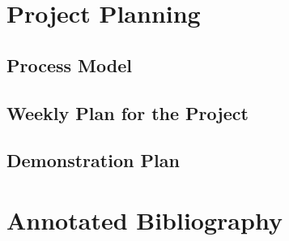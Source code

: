 \documentclass[11pt,fleqn,twoside]{article}
\begin{document}
\section{Project Planning}


\subsection{Process Model}

\subsection{Weekly Plan for the Project}

\subsection{Demonstration Plan}

\section*{Annotated Bibliography}
\end{document}
